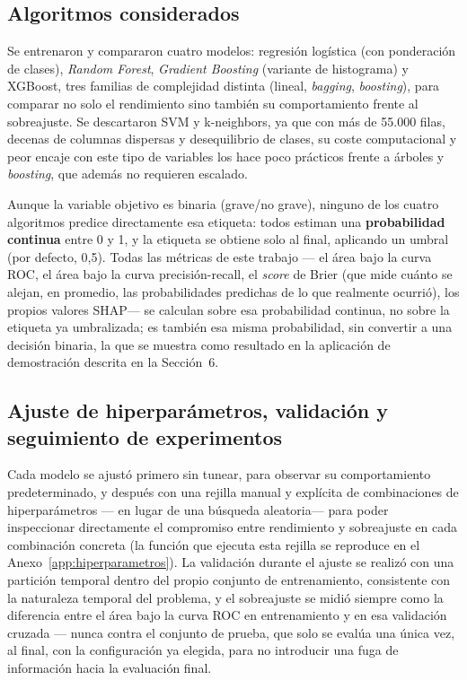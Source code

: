 \documentclass[11pt,a4paper]{article}
\begin{document}
\subsection{Algoritmos considerados}

Se entrenaron y compararon cuatro modelos: regresión logística (con ponderación de clases), \emph{Random Forest}, \emph{Gradient Boosting} (variante de histograma) y XGBoost, tres familias de complejidad distinta (lineal, \emph{bagging}, \emph{boosting}), para comparar no solo el rendimiento sino también su comportamiento frente al sobreajuste. Se descartaron SVM y k-neighbors, ya que con más de 55.000 filas, decenas de columnas dispersas y desequilibrio de clases, su coste computacional y peor encaje con este tipo de variables los hace poco prácticos frente a árboles y \emph{boosting}, que además no requieren escalado.

Aunque la variable objetivo es binaria (grave/no grave), ninguno de los cuatro algoritmos predice directamente esa etiqueta: todos estiman una \textbf{probabilidad continua} entre 0 y 1, y la etiqueta se obtiene solo al final, aplicando un umbral (por defecto, 0,5). Todas las métricas de este trabajo --- el área bajo la curva ROC, el área bajo la curva precisión-recall, el \emph{score} de Brier (que mide cuánto se alejan, en promedio, las probabilidades predichas de lo que realmente ocurrió), los propios valores SHAP--- se calculan sobre esa probabilidad continua, no sobre la etiqueta ya umbralizada; es también esa misma probabilidad, sin convertir a una decisión binaria, la que se muestra como resultado en la aplicación de demostración descrita en la Sección~6.

\subsection{Ajuste de hiperparámetros, validación y seguimiento de experimentos}

Cada modelo se ajustó primero sin tunear, para observar su comportamiento predeterminado, y después con una rejilla manual y explícita de combinaciones de hiperparámetros --- en lugar de una búsqueda aleatoria--- para poder inspeccionar directamente el compromiso entre rendimiento y sobreajuste en cada combinación concreta (la función que ejecuta esta rejilla se reproduce en el Anexo~\ref{app:hiperparametros}). La validación durante el ajuste se realizó con una partición temporal dentro del propio conjunto de entrenamiento, consistente con la naturaleza temporal del problema, y el sobreajuste se midió siempre como la diferencia entre el área bajo la curva ROC en entrenamiento y en esa validación cruzada --- nunca contra el conjunto de prueba, que solo se evalúa una única vez, al final, con la configuración ya elegida, para no introducir una fuga de información hacia la evaluación final.
\end{document}

